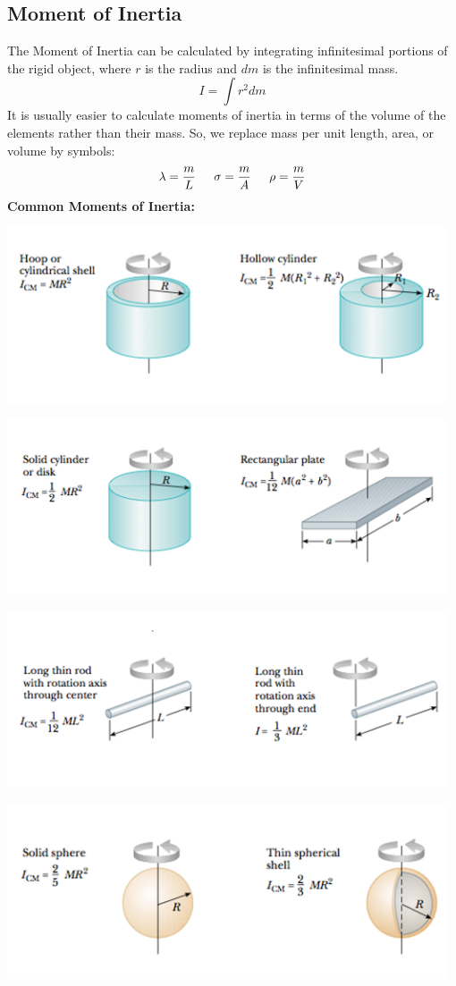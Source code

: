 \documentclass{article}
\begin{document}
\subsection{Moment of Inertia}
The Moment of Inertia can be calculated by integrating infinitesimal portions of the rigid object, where $r$ is the radius and $dm$ is the infinitesimal mass.
\[
I=\int r^2 dm
\]
It is usually easier to calculate moments of inertia in terms of the volume of the elements rather than their mass. So, we replace mass per unit length, area, or volume by symbols:
\[
\lambda=\frac{m}{L} \indent
\sigma=\frac{m}{A} \indent
\rho=\frac{m}{V}
\]
\textbf{Common Moments of Inertia:}\\
\centerline{\includegraphics[width=13cm]{cmi1.png}}
\centerline{\includegraphics[width=13cm]{cmi2.png}}
\centerline{\includegraphics[width=13cm]{cmi3.png}}
\centerline{\includegraphics[width=13cm]{cmi4.png}}
\end{document}
